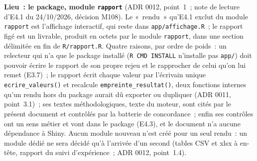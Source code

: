 \documentclass[a4paper,11pt]{article}
\newcommand{\code}[1]{\texttt{\small #1}}
\begin{document}
\medskip
\noindent
\textbf{Lieu~: le package, module \code{rapport}} (ADR 0012, point~1~; note
de lecture d'E4.1 du 24/10/2026, décision M108). Le «~rendu~» qu'E4.1 exclut
du module \code{rapport} est l'affichage interactif, qui reste dans
\code{app/affichage.R}~; le rapport figé est un livrable, produit en octets
par le module \code{rapport}, dans une section délimitée en fin de
\code{R/rapport.R}. Quatre raisons, par ordre de poids~: un relecteur qui
n'a que le package installé (\code{R CMD INSTALL} n'installe pas
\code{app/}) doit pouvoir écrire le rapport de son propre rejeu et le
rapprocher de celui qu'on lui remet (E3.7)~; le rapport écrit chaque valeur
par l'écrivain unique \code{ecrire\_valeurs()} et recalcule
\code{empreinte\_resultat()}, deux fonctions internes qu'un rendu hors du
package aurait dû exporter ou dupliquer (ADR 0011, point~3.1)~; ses textes
méthodologiques, texte du moteur, sont cités par le présent document et
contrôlés par la batterie de concordance~; enfin ses contrôles ont un sens
métier et vont dans le package (E4.3), et le document n'a aucune dépendance
à Shiny. Aucun module nouveau n'est créé pour un seul rendu~: un module
dédié ne sera décidé qu'à l'arrivée d'un second (tables CSV et xlsx à
en-tête, rapport du suivi d'expérience~; ADR 0012, point~1.4).
\end{document}
